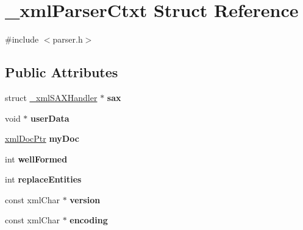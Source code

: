 \hypertarget{struct__xml_parser_ctxt}{}\section{\+\_\+xml\+Parser\+Ctxt Struct Reference}
\label{struct__xml_parser_ctxt}


{\ttfamily \#include $<$parser.\+h$>$}

\subsection*{Public Attributes}
\begin{DoxyCompactItemize}
\item 
\mbox{\label{struct__xml_parser_ctxt_a6461422cb3f71bd1eeea538a7c72b56e}} 
struct \mbox{\hyperlink{struct__xml_s_a_x_handler}{\+\_\+xml\+S\+A\+X\+Handler}} $\ast$ {\bfseries sax}
\item 
\mbox{\label{struct__xml_parser_ctxt_ae23873a107a9dc280a0a4daba0f21671}} 
void $\ast$ {\bfseries user\+Data}
\item 
\mbox{\label{struct__xml_parser_ctxt_a7058431b5a7781f3ecb400a0687b35de}} 
\mbox{\hyperlink{struct__xml_doc}{xml\+Doc\+Ptr}} {\bfseries my\+Doc}
\item 
\mbox{\label{struct__xml_parser_ctxt_a304fdc65a808cab0e5057770375d1809}} 
int {\bfseries well\+Formed}
\item 
\mbox{\label{struct__xml_parser_ctxt_a1649ee3fa54a9a0a666f82c5738faf80}} 
int {\bfseries replace\+Entities}
\item 
\mbox{\label{struct__xml_parser_ctxt_ac3b0f4294a275545b1305218d90d02ea}} 
const xml\+Char $\ast$ {\bfseries version}
\item 
\mbox{\label{struct__xml_parser_ctxt_a8ab949233a869865002ede3ef6c1a452}} 
const xml\+Char $\ast$ {\bfseries encoding}
\item 
\mbox{\label{struct__xml_parser_ctxt_ad92c2a15082cf72806f8b6499b12b4d5}} 

\end{DoxyCompactItemize}
